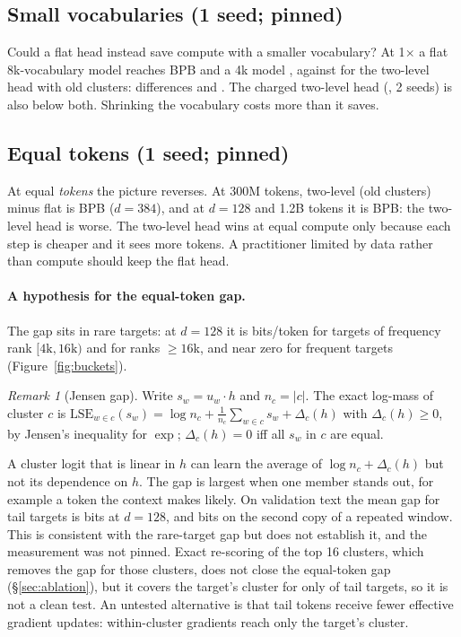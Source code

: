 \documentclass[11pt]{article}
\theoremstyle{remark}
\newtheorem{remark}{Remark}
\begin{document}
\subsection{Small vocabularies (1 seed; pinned)}\label{sec:smallv}
Could a flat head instead save compute with a smaller vocabulary? At 1$\times$ a flat 8k-vocabulary model reaches \BpbFeight{} BPB
and a 4k model \BpbFfour{}, against \BpbHsFive{} for the two-level head with old clusters: differences \SmallVocabDelta{} and
\SmallVocabDeltaFour{}. The charged two-level head (\MainTwoMean{}, 2 seeds) is also below both. Shrinking the vocabulary costs
more than it saves.

\subsection{Equal tokens (1 seed; pinned)}\label{sec:eqtok}
At equal \emph{tokens} the picture reverses. At 300M tokens, two-level (old clusters) minus flat is \EqTokDelta{} BPB ($d=384$), and at $d=128$ and 1.2B tokens it is \SmallEqTokBpb{} BPB: the two-level head is worse. The two-level head wins at equal compute
only because each step is cheaper and it sees more tokens. A practitioner limited by data rather than compute should keep the flat
head.

\paragraph{A hypothesis for the equal-token gap.} The gap sits in rare targets: at $d=128$ it is \BucketSmallBitsD{} bits/token
for targets of frequency rank $[4\text{k}, 16\text{k})$ and \BucketSmallBitsE{} for ranks $\ge 16$k, and near zero for frequent
targets (Figure~\ref{fig:buckets}).
\begin{remark}[Jensen gap]
Write $s_w = u_w \cdot h$ and $n_c = |c|$. The exact log-mass of cluster $c$ is $\mathrm{LSE}_{w \in c}(s_w) = \log n_c +
\frac{1}{n_c}\sum_{w \in c} s_w + \Delta_c(h)$ with $\Delta_c(h) \ge 0$, by Jensen's inequality for $\exp$; $\Delta_c(h) = 0$ iff
all $s_w$ in $c$ are equal.
\end{remark}
\noindent A cluster logit that is linear in $h$ can learn the average of $\log n_c + \Delta_c(h)$ but not its dependence on $h$.
The gap is largest when one member stands out, for example a token the context makes likely. On validation text the mean gap for
tail targets is \JensenBitsSmallVal{} bits at $d=128$, and \JensenBitsSmallCopyTwo{} bits on the second copy of a repeated
window. This is consistent with the rare-target gap but does not establish it, and the measurement was not pinned. Exact
re-scoring of the top 16 clusters, which removes the gap for those clusters, does not close the equal-token gap
(\S\ref{sec:ablation}), but it covers the target's cluster for only \RsHit{} of tail targets, so it is not a clean test. An
untested alternative is that tail tokens receive fewer effective gradient updates: within-cluster gradients reach only the
target's cluster.
\end{document}
